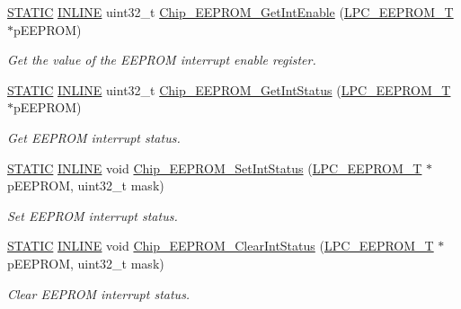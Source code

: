 \begin{DoxyCompactItemize}
\hyperlink{group___l_p_c___types___public___macros_ga10b2d890d871e1489bb02b7e70d9bdfb}{S\+T\+A\+T\+IC} \hyperlink{spifi__18xx__43xx_8h_a2eb6f9e0395b47b8d5e3eeae4fe0c116}{I\+N\+L\+I\+NE} uint32\+\_\+t \hyperlink{group___e_e_p_r_o_m__18_x_x__43_x_x_gabc5dffbf26c343bfccd25bface186de0}{Chip\+\_\+\+E\+E\+P\+R\+O\+M\+\_\+\+Get\+Int\+Enable} (\hyperlink{struct_l_p_c___e_e_p_r_o_m___t}{L\+P\+C\+\_\+\+E\+E\+P\+R\+O\+M\+\_\+T} $\ast$p\+E\+E\+P\+R\+OM)
\begin{DoxyCompactList}\small\item\em Get the value of the E\+E\+P\+R\+OM interrupt enable register. \end{DoxyCompactList}\item 
\hyperlink{group___l_p_c___types___public___macros_ga10b2d890d871e1489bb02b7e70d9bdfb}{S\+T\+A\+T\+IC} \hyperlink{spifi__18xx__43xx_8h_a2eb6f9e0395b47b8d5e3eeae4fe0c116}{I\+N\+L\+I\+NE} uint32\+\_\+t \hyperlink{group___e_e_p_r_o_m__18_x_x__43_x_x_ga19e670ed83dcab5cc21237a3150ff082}{Chip\+\_\+\+E\+E\+P\+R\+O\+M\+\_\+\+Get\+Int\+Status} (\hyperlink{struct_l_p_c___e_e_p_r_o_m___t}{L\+P\+C\+\_\+\+E\+E\+P\+R\+O\+M\+\_\+T} $\ast$p\+E\+E\+P\+R\+OM)
\begin{DoxyCompactList}\small\item\em Get E\+E\+P\+R\+OM interrupt status. \end{DoxyCompactList}\item 
\hyperlink{group___l_p_c___types___public___macros_ga10b2d890d871e1489bb02b7e70d9bdfb}{S\+T\+A\+T\+IC} \hyperlink{spifi__18xx__43xx_8h_a2eb6f9e0395b47b8d5e3eeae4fe0c116}{I\+N\+L\+I\+NE} void \hyperlink{group___e_e_p_r_o_m__18_x_x__43_x_x_gacebf288107d6f4a68f805a063205cf8e}{Chip\+\_\+\+E\+E\+P\+R\+O\+M\+\_\+\+Set\+Int\+Status} (\hyperlink{struct_l_p_c___e_e_p_r_o_m___t}{L\+P\+C\+\_\+\+E\+E\+P\+R\+O\+M\+\_\+T} $\ast$p\+E\+E\+P\+R\+OM, uint32\+\_\+t mask)
\begin{DoxyCompactList}\small\item\em Set E\+E\+P\+R\+OM interrupt status. \end{DoxyCompactList}\item 
\hyperlink{group___l_p_c___types___public___macros_ga10b2d890d871e1489bb02b7e70d9bdfb}{S\+T\+A\+T\+IC} \hyperlink{spifi__18xx__43xx_8h_a2eb6f9e0395b47b8d5e3eeae4fe0c116}{I\+N\+L\+I\+NE} void \hyperlink{group___e_e_p_r_o_m__18_x_x__43_x_x_gae551204eb5e0c647ea853bc3a19aa33c}{Chip\+\_\+\+E\+E\+P\+R\+O\+M\+\_\+\+Clear\+Int\+Status} (\hyperlink{struct_l_p_c___e_e_p_r_o_m___t}{L\+P\+C\+\_\+\+E\+E\+P\+R\+O\+M\+\_\+T} $\ast$p\+E\+E\+P\+R\+OM, uint32\+\_\+t mask)
\begin{DoxyCompactList}\small\item\em Clear E\+E\+P\+R\+OM interrupt status. \end{DoxyCompactList}\end{DoxyCompactItemize}


